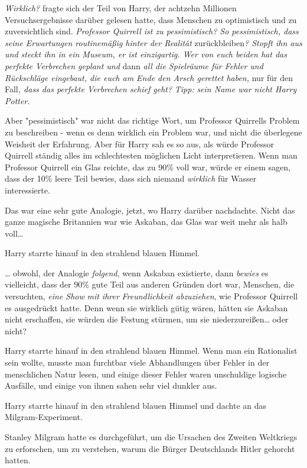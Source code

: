 {\emph{Wirklich?} fragte sich der Teil von Harry, der achtzehn Millionen Versuchsergebnisse darüber gelesen hatte, dass Menschen zu optimistisch und zu zuversichtlich sind. \emph{Professor Quirrell ist zu pessimistisch? So pessimistisch, dass seine Erwartungen routinemäßig hinter der Realität} zurückbleiben\emph{? Stopft ihn aus und steckt ihn in ein Museum, er ist einzigartig. Wer von euch beiden hat das perfekte Verbrechen geplant und} dann \emph{all die Spielräume für Fehler und Rückschläge eingebaut, die euch am Ende den Arsch gerettet haben,} nur für den Fall\emph{, dass das perfekte Verbrechen schief geht?} \emph{Tipp:} \emph{sein Name war nicht Harry Potter.}

Aber "pessimistisch" war nicht das richtige Wort, um Professor Quirrells Problem zu beschreiben - wenn es denn wirklich ein Problem war, und nicht die überlegene Weisheit der Erfahrung. Aber für Harry sah es so aus, als würde Professor Quirrell ständig alles im schlechtesten möglichen Licht interpretieren. Wenn man Professor Quirrell ein Glas reichte, das zu 90\% voll war, würde er einem sagen, dass der 10\% leere Teil bewies, dass sich niemand \emph{wirklich} für Wasser interessierte.

Das war eine sehr gute Analogie, jetzt, wo Harry darüber nachdachte. Nicht das ganze magische Britannien war wie Askaban, das Glas war weit mehr als halb voll…

Harry starrte hinauf in den strahlend blauen Himmel.

… obwohl, der Analogie \emph{folgend}, wenn Askaban existierte, dann \emph{bewies} es vielleicht, dass der 90\% gute Teil aus anderen Gründen dort war, Menschen, die versuchten, \emph{eine Show} \emph{mit ihrer} \emph{Freundlichkeit abzuziehen}, wie Professor Quirrell es ausgedrückt hatte. Denn wenn sie wirklich gütig wären, hätten sie Askaban nicht erschaffen, sie würden die Festung stürmen, um sie niederzureißen… oder nicht?

Harry starrte hinauf in den strahlend blauen Himmel. Wenn man ein Rationalist sein wollte, musste man furchtbar viele Abhandlungen über Fehler in der menschlichen Natur lesen, und einige dieser Fehler waren unschuldige logische Ausfälle, und einige von ihnen sahen sehr viel dunkler aus.

Harry starrte hinauf in den strahlend blauen Himmel und dachte an das Milgram-Experiment.

Stanley Milgram hatte es durchgeführt, um die Ursachen des Zweiten Weltkriegs zu erforschen, um zu verstehen, warum die Bürger Deutschlands Hitler gehorcht hatten.

}
